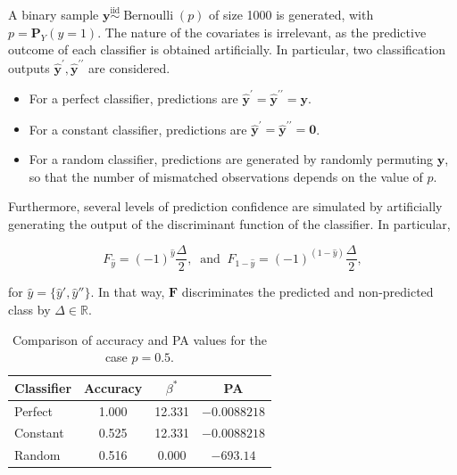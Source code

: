 \begin{experiment}
    A binary sample $\bm{y} \overset{\text{iid}}{\sim} \operatorname{Bernoulli}(p)$ of size 1000 is generated, 
    with $p = \mathbf{P}_Y(y = 1)$. The nature of the covariates is irrelevant, as the predictive outcome of each
    classifier is obtained artificially. In particular, two classification outputs $\bm{\hat{y}}^\prime, \bm{\hat{y}}^{\prime \prime}$ are 
    considered.

    \begin{itemize}
        \item For a perfect classifier, predictions are $\bm{\hat{y}}^\prime = \bm{\hat{y}}^{\prime \prime} = \bm{y}$.
        \item For a constant classifier, predictions are $\bm{\hat{y}}^\prime = \bm{\hat{y}}^{\prime \prime} = \bm{0}$.
        \item For a random classifier, predictions are generated by randomly permuting $\bm{y}$, so 
        that the number of mismatched observations depends on the value of $p$. 

    \end{itemize}
        
    Furthermore, several levels of prediction confidence are simulated by artificially generating the
    output of the discriminant function of the classifier. In particular,

    $$
    F_{\hat{y}} = (-1)^{\hat{y}} \frac{\Delta}{2}, \;\; \text{and} \;\; F_{1 - \hat{y}} = (-1)^{(1-\hat{y})} \frac{\Delta}{2},
    $$
    
    for $\hat{y} = \{\hat{y}',\hat{y}''\}$. In that way, $\bm{F}$ discriminates the predicted and non-predicted class 
    by $\Delta \in \mathbb{R}$. 
    
    
\end{experiment}

\begin{table}[H]
    \centering
    \begin{tabular}{lccc}
    Classifier & Accuracy & $\beta^*$ & PA \\
    \midrule
    Perfect   & 1.000     & 12.331  & $-0.0088218$ \\
    Constant  & 0.525     & 12.331  & $-0.0088218$ \\
    Random    & 0.516     & 0.000   & $-693.14$    \\
    \bottomrule
    \end{tabular}
    \caption{Comparison of accuracy and PA values for the case $p = 0.5$.}
    \label{tab:empirical_table}
\end{table}


